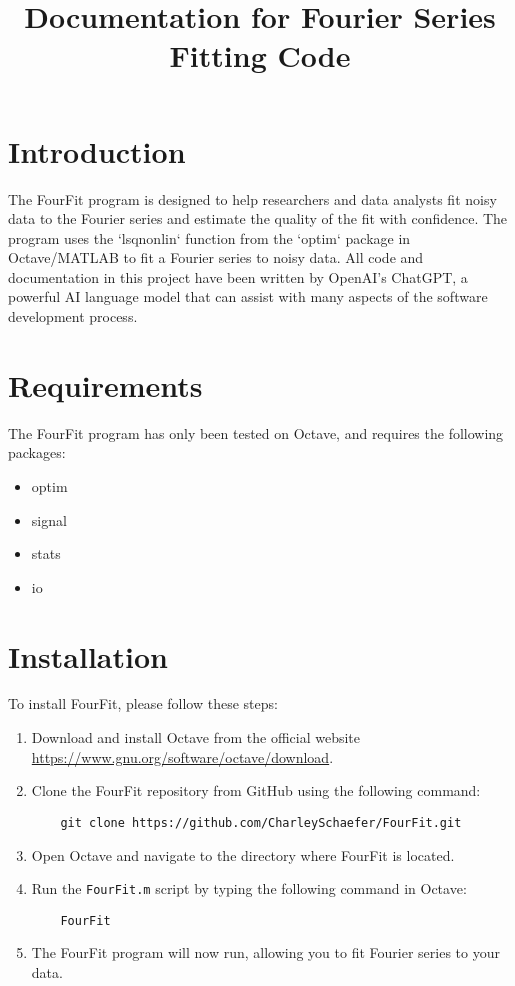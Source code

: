 \documentclass{article}
\begin{document}
\title{Documentation for Fourier Series Fitting Code}
\maketitle
\section{Introduction}
The FourFit program is designed to help researchers and data analysts fit noisy data to the Fourier series and estimate the quality of the fit with confidence. The program uses the `lsqnonlin` function from the `optim` package in Octave/MATLAB to fit a Fourier series to noisy data. All code and documentation in this project have been written by OpenAI's ChatGPT, a powerful AI language model that can assist with many aspects of the software development process.



\section{Requirements}\label{sec:requirements}
The FourFit program has only been tested on Octave, and requires the following packages:
\begin{itemize}
    \item optim
    \item signal
    \item stats
    \item io
\end{itemize}

\section{Installation}
To install FourFit, please follow these steps:

\begin{enumerate}
  \item Download and install Octave from the official website \url{https://www.gnu.org/software/octave/download}.
  \item Clone the FourFit repository from GitHub using the following command:
  \begin{verbatim}
    git clone https://github.com/CharleySchaefer/FourFit.git
  \end{verbatim}
  \item Open Octave and navigate to the directory where FourFit is located.
  \item Run the \texttt{FourFit.m} script by typing the following command in Octave:
  \begin{verbatim}
    FourFit
  \end{verbatim}
  \item The FourFit program will now run, allowing you to fit Fourier series to your data.
\end{enumerate}
\end{document}
